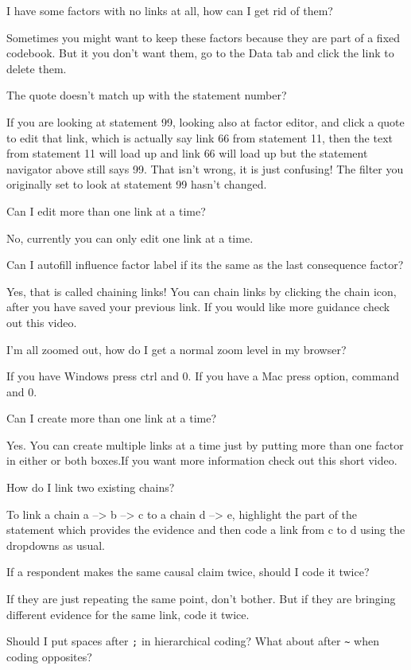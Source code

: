 \documentclass[
]{book}
\begin{document}
I have some factors with no links at all, how can I get rid of them?

Sometimes you might want to keep these factors because they are part of a fixed codebook. But it you don't want them, go to the Data tab and click the link to delete them.

The quote doesn't match up with the statement number?

If you are looking at statement 99, looking also at factor editor, and click a quote to edit that link, which is actually say link 66 from statement 11, then the text from statement 11 will load up and link 66 will load up but the statement navigator above still says 99. That isn't wrong, it is just confusing! The filter you originally set to look at statement 99 hasn't changed.

Can I edit more than one link at a time?

No, currently you can only edit one link at a time.

Can I autofill influence factor label if its the same as the last consequence factor?

Yes, that is called chaining links! You can chain links by clicking the chain icon, after you have saved your previous link. If you would like more guidance check out this video.

I'm all zoomed out, how do I get a normal zoom level in my browser?

If you have Windows press ctrl and 0. If you have a Mac press option, command and 0.

Can I create more than one link at a time?

Yes. You can create multiple links at a time just by putting more than one factor in either or both boxes.If you want more information check out this short video.

How do I link two existing chains?

To link a chain a --\textgreater{} b --\textgreater{} c to a chain d --\textgreater{} e, highlight the part of the statement which provides the evidence and then code a link from c to d using the dropdowns as usual.

If a respondent makes the same causal claim twice, should I code it twice?

If they are just repeating the same point, don't bother. But if they are bringing different evidence for the same link, code it twice.

Should I put spaces after \texttt{;} in hierarchical coding? What about after \texttt{\textasciitilde{}} when coding opposites?
\end{document}
